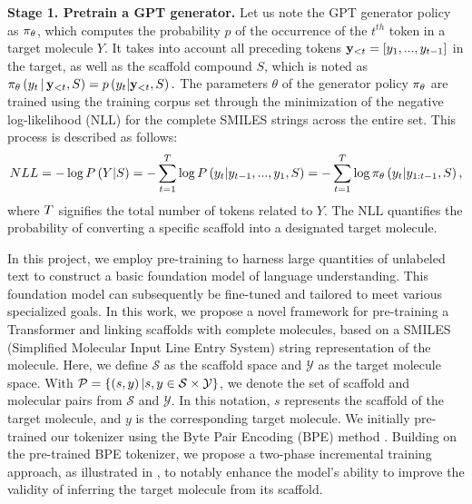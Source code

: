 \textbf{Stage 1. Pretrain a GPT generator.} 
Let us note the GPT generator policy as $\pi_{\theta}$, which computes the probability $p$ of the occurrence of the $t^{th}$ token in a target molecule $Y$. It takes into account all preceding tokens $\mathbf{y}_{<t} = \left[y_1, ..., y_{t-1}\right]$ in the target, as well as the scaffold compound $S$, which is noted as
$\pi_{\theta} \left( {y_t {\,|\,} \mathbf{y}_{<t},S} \right) =p \left( {y_{t}|\mathbf{y}_{<t},S} \right) .$
The parameters $\theta$ of the generator policy $\pi_{\theta}$ are trained using the training corpus set through the minimization of the negative log-likelihood (NLL) for the complete SMILES strings across the entire set.
This process is described as follows:
\begin{align}\label{eq:pretrain-loss}
    NLL =  - \log {P} \left( {Y|S} \right)  
    =-\sum_{t=1}^{T} \log {P} \left( {y_{t}|y_{t-1},...,y_{1},S} \right) 
   =-\sum_{t=1}^{T} \log \pi_{\theta} \left( {y_t|y_{1:t-1}, S} \right) ,
\end{align}
where $T$ signifies the total number of tokens related to $Y$. The NLL quantifies the probability of converting a specific scaffold into a designated target molecule. 

In this project, we employ pre-training to harness large quantities of unlabeled text to construct a basic foundation model of language understanding. This foundation model can subsequently be fine-tuned and tailored to meet various specialized goals.
In this work, we propose a novel framework for pre-training a Transformer and linking scaffolds with complete molecules, based on a SMILES (Simplified Molecular Input Line Entry System) \citep{weininger1988smiles}  string representation of the molecule. Here, we define $\mathcal{S}$ as the scaffold space and $\mathcal{Y}$ as the target molecule space. With $\mathcal{P}=\left\{ \left( {s,y} \right) |s,y\in \mathcal{S} \times \mathcal{Y}\right\}$, we denote the set of scaffold and molecular pairs from $\mathcal{S}$ and $\mathcal{Y}$. In this notation, $s$ represents the scaffold of the target molecule, and $y$ is the corresponding target molecule.
We initially pre-trained our tokenizer using the Byte Pair Encoding (BPE) method .  
Building on the pre-trained BPE tokenizer, we propose a two-phase incremental training approach,
as illustrated in , to notably enhance the model's ability to improve the validity of inferring the target molecule from its scaffold.

